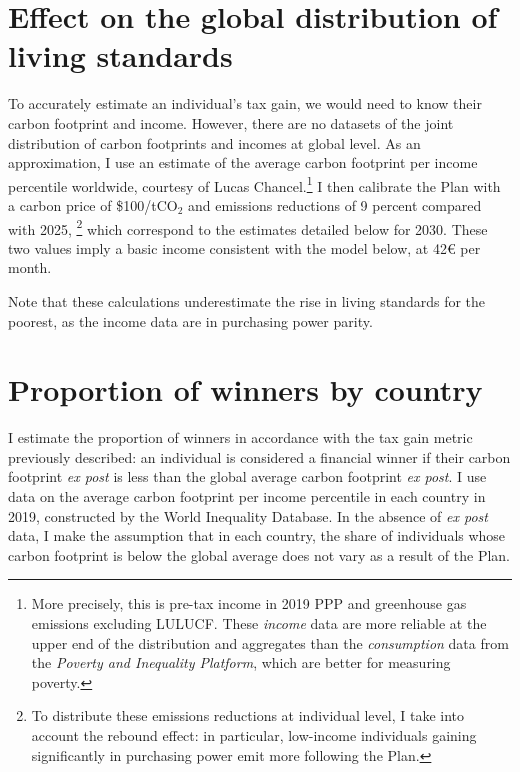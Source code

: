 \documentclass[a5paper,english,openany]{memoir}
\begin{document}
\section*{Effect on the global distribution of living standards}\label{app:revenus}

To accurately estimate an individual's tax gain, we would need to know their %
carbon footprint and income. However, there are no datasets of the joint distribution of carbon footprints and incomes at global level. As an approximation, I use an estimate of the average carbon footprint per income percentile worldwide, courtesy of Lucas Chancel.\footnote{More precisely, this is pre-tax income in 2019 PPP \textit{\texteuro{}} and greenhouse gas emissions excluding LULUCF. These \textit{income} data are more reliable at the upper end of the distribution and aggregates than the \textit{consumption} data from the \textit{Poverty and Inequality Platform}, which are better for measuring poverty.} I then calibrate the Plan with a carbon price of \$100/tCO$_\text{2}$ and emissions reductions of 9 percent compared with 2025,%
\footnote{To distribute these emissions reductions at individual level, I take into account the rebound effect: in particular, low-income individuals gaining significantly in purchasing power emit more following the Plan.} which correspond to the estimates detailed below for 2030. These two values imply a basic income consistent with the model below, at 42\euro{} per month. %

Note %
that these calculations underestimate the rise in living standards for the poorest, as the income data are in purchasing power parity.

\section*{Proportion of winners by country}

I estimate the proportion of winners in accordance with the tax gain metric previously described: an individual is considered a financial winner if their %
carbon footprint \textit{ex post} is less than the global average carbon footprint \textit{ex post}. I use data on the average carbon footprint per income percentile in each country in 2019, constructed by the World Inequality Database. In the absence of \textit{ex post} data, I make the assumption that in each country, the share of individuals whose carbon footprint is below the global average does not vary as a result of the Plan.
\end{document}

